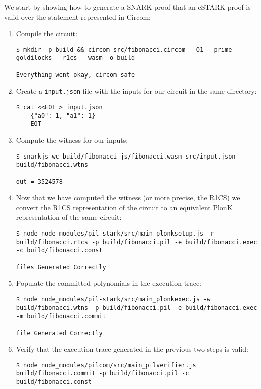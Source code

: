 We start by showing how to generate a SNARK proof that an eSTARK proof is valid over the statement represented in Circom:
\begin{enumerate}
\item Compile the circuit:
\begin{lstlisting}[style=termt]
$ mkdir -p build && circom src/fibonacci.circom --O1 --prime goldilocks --r1cs --wasm -o build

Everything went okay, circom safe
\end{lstlisting}

\item Create a \texttt{input.json} file with the inputs for our circuit in the same directory:
\begin{lstlisting}[style=termt]
$ cat <<EOT > input.json
    {"a0": 1, "a1": 1}
    EOT
\end{lstlisting}

\item Compute the witness for our inputs:
\begin{lstlisting}[style=termt]
$ snarkjs wc build/fibonacci_js/fibonacci.wasm src/input.json build/fibonacci.wtns

out = 3524578
\end{lstlisting}

\item Now that we have computed the witness (or more precise, the R1CS) we convert the R1CS representation of the circuit to an equivalent PlonK representation of the same circuit:
\begin{lstlisting}[style=termt]
$ node node_modules/pil-stark/src/main_plonksetup.js -r build/fibonacci.r1cs -p build/fibonacci.pil -e build/fibonacci.exec -c build/fibonacci.const

files Generated Correctly
\end{lstlisting}

\item Populate the committed polynomials in the execution trace:
\begin{lstlisting}[style=termt]
$ node node_modules/pil-stark/src/main_plonkexec.js -w build/fibonacci.wtns -p build/fibonacci.pil -e build/fibonacci.exec -m build/fibonacci.commit

file Generated Correctly
\end{lstlisting}

\item Verify that the execution trace generated in the previous two steps is valid:
\begin{lstlisting}[style=termt]
$ node node_modules/pilcom/src/main_pilverifier.js build/fibonacci.commit -p build/fibonacci.pil -c build/fibonacci.const


\end{lstlisting}
\end{enumerate}
